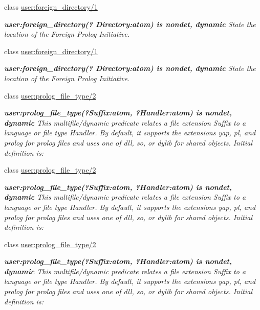 \begin{DoxyCompactItemize}
class \hyperlink{classuser_1_1foreign__directory_21}{user\+:foreign\+\_\+directory/1}
\begin{DoxyCompactList}\small\item\em {\bfseries  user\+:foreign\+\_\+directory(? {\itshape Directory}\+:atom) is nondet, dynamic } State the location of the Foreign Prolog Initiative. \end{DoxyCompactList}\item 
class \hyperlink{classuser_1_1foreign__directory_21}{user\+:foreign\+\_\+directory/1}
\begin{DoxyCompactList}\small\item\em {\bfseries  user\+:foreign\+\_\+directory(? {\itshape Directory}\+:atom) is nondet, dynamic } State the location of the Foreign Prolog Initiative. \end{DoxyCompactList}\item 
class \hyperlink{classuser_1_1prolog__file__type_22}{user\+:prolog\+\_\+file\+\_\+type/2}
\begin{DoxyCompactList}\small\item\em {\bfseries  user\+:prolog\+\_\+file\+\_\+type(?Suffix\+:atom, ?Handler\+:atom) is nondet, dynamic } This multifile/dynamic predicate relates a file extension {\itshape Suffix} to a language or file type {\itshape Handler}. By default, it supports the extensions yap, pl, and prolog for prolog files and uses one of dll, so, or dylib for shared objects. Initial definition is\+: \end{DoxyCompactList}\item 
class \hyperlink{classuser_1_1prolog__file__type_22}{user\+:prolog\+\_\+file\+\_\+type/2}
\begin{DoxyCompactList}\small\item\em {\bfseries  user\+:prolog\+\_\+file\+\_\+type(?Suffix\+:atom, ?Handler\+:atom) is nondet, dynamic } This multifile/dynamic predicate relates a file extension {\itshape Suffix} to a language or file type {\itshape Handler}. By default, it supports the extensions yap, pl, and prolog for prolog files and uses one of dll, so, or dylib for shared objects. Initial definition is\+: \end{DoxyCompactList}\item 
class \hyperlink{classuser_1_1prolog__file__type_22}{user\+:prolog\+\_\+file\+\_\+type/2}
\begin{DoxyCompactList}\small\item\em {\bfseries  user\+:prolog\+\_\+file\+\_\+type(?Suffix\+:atom, ?Handler\+:atom) is nondet, dynamic } This multifile/dynamic predicate relates a file extension {\itshape Suffix} to a language or file type {\itshape Handler}. By default, it supports the extensions yap, pl, and prolog for prolog files and uses one of dll, so, or dylib for shared objects. Initial definition is\+: \end{DoxyCompactList}\item 

\end{DoxyCompactItemize}
